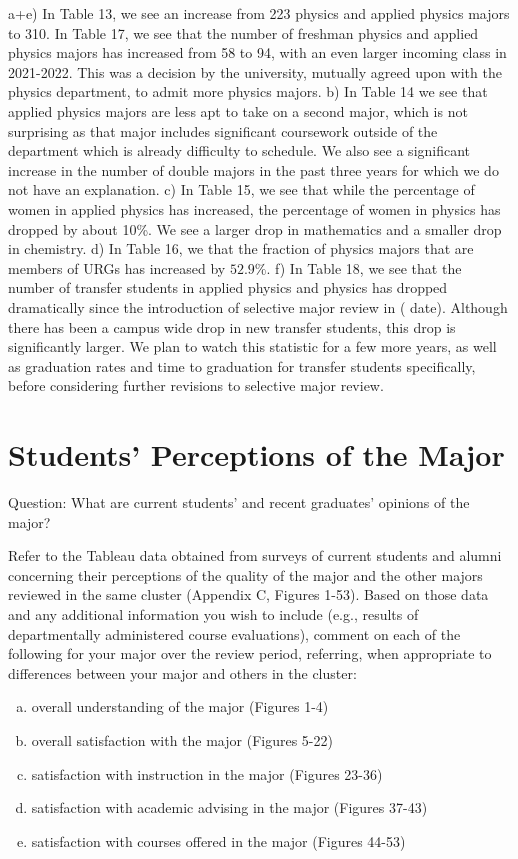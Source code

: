 \documentclass[12pt]{article}
\begin{document}
a+e) In Table 13, we see an increase from 223 physics and applied physics majors to 310.  In Table 17, we see that the number of freshman physics and applied physics majors has increased from 58 to 94, with an even larger incoming class in 2021-2022.  This was a decision by the university, mutually agreed upon with the physics department, to admit more physics majors. 
b) In Table 14 we see that applied physics majors are less apt to take on a second major, which is not surprising as that major includes significant coursework outside of the department which is already difficulty to schedule.  We also see a significant increase in the number of double majors in the past three years for which we do not have an explanation.
c) In Table 15, we see that while the percentage of women in applied physics has increased, the percentage of women in physics has dropped by about 10\%.  We see a larger drop in mathematics and a smaller drop in chemistry.  
d) In Table 16, we that the fraction of physics majors that are members of URGs has increased by $52.9\%$.
f) In Table 18, we see that the number of transfer students in applied physics and physics has dropped dramatically since the introduction of selective major review in ({\color{red} date}).  Although there has been a campus wide drop in new transfer students, this drop is significantly larger.  We plan to watch this statistic for a few more years, as well as graduation rates and time to graduation for transfer students specifically, before considering further revisions to selective major review.





\section{Students’ Perceptions of the Major}
Question: What are current students’ and recent graduates’ opinions of the major?

Refer to the Tableau data obtained from surveys of current students and alumni concerning their perceptions of the quality of the major and the other majors reviewed in the same cluster (Appendix C, Figures 1-53). Based on those data and any additional information you wish to include (e.g., results of departmentally administered course evaluations), comment on each of the following for your major over the review period, referring, when appropriate to differences between your major and others in the cluster:

\begin{enumerate}[a)]
    \item overall understanding of the major (Figures 1-4)
    \item overall satisfaction with the major (Figures 5-22)
    \item satisfaction with instruction in the major (Figures 23-36)
    \item satisfaction with academic advising in the major (Figures 37-43)
    \item satisfaction with courses offered in the major (Figures 44-53)
\end{enumerate}
\end{document}
